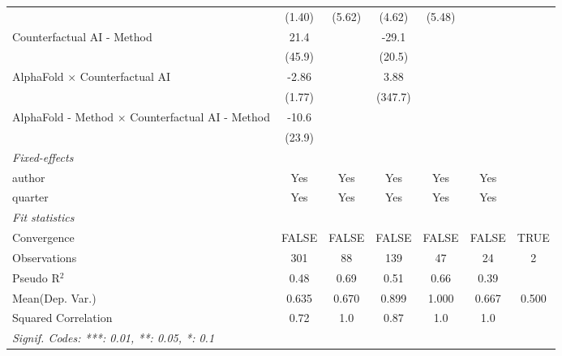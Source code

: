 \begin{tabular}{lcccccc}
                                                           & (1.40)   & (5.62)       & (4.62)  & (5.48)        &         &   \\   
   Counterfactual AI - Method                              & 21.4     &              & -29.1   &               &         &   \\   
                                                           & (45.9)   &              & (20.5)  &               &         &   \\   
   AlphaFold $\times$ Counterfactual AI                    & -2.86    &              & 3.88    &               &         &   \\   
                                                           & (1.77)   &              & (347.7) &               &         &   \\   
   AlphaFold - Method $\times$ Counterfactual AI - Method  & -10.6    &              &         &               &         &   \\   
                                                           & (23.9)   &              &         &               &         &   \\   
   \midrule
   \emph{Fixed-effects}\\
   author                                                  & Yes      & Yes          & Yes     & Yes           & Yes     & \\  
   quarter                                                 & Yes      & Yes          & Yes     & Yes           & Yes     & \\  
   \midrule
   \emph{Fit statistics}\\
   Convergence                                             &FALSE     & FALSE        & FALSE   & FALSE         & FALSE   & TRUE\\  
   Observations                                            & 301      & 88           & 139     & 47            & 24      & 2\\  
   Pseudo R$^2$                                            & 0.48     & 0.69         & 0.51    & 0.66          & 0.39    & \\  
Mean(Dep. Var.) & 0.635 & 0.670 & 0.899 & 1.000 & 0.667 & 0.500 \\
   Squared Correlation                                     & 0.72     & 1.0          & 0.87    & 1.0           & 1.0     & \\  
   \midrule \midrule
   \multicolumn{7}{l}{\emph{Signif. Codes: ***: 0.01, **: 0.05, *: 0.1}}\\
\end{tabular}
\par\endgroup
